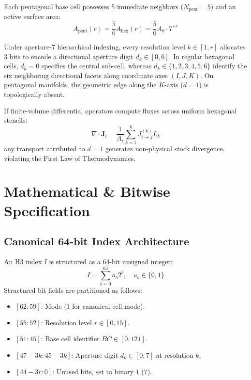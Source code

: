 \documentclass[10pt,twocolumn,a4paper]{article}
\theoremstyle{definition}
\begin{document}
Each pentagonal base cell possesses 5 immediate neighbors ($N_{\text{pent}} = 5$) and an active surface area:
\begin{equation}
A_{\text{pent}}(r) = \frac{5}{6} A_{\text{hex}}(r) = \frac{5}{6} A_0 \cdot 7^{-r}
\end{equation}

Under aperture-7 hierarchical indexing, every resolution level $k \in [1, r]$ allocates 3 bits to encode a directional aperture digit $d_k \in [0, 6]$. In regular hexagonal cells, $d_k = 0$ specifies the central sub-cell, whereas $d_k \in \{1, 2, 3, 4, 5, 6\}$ identify the six neighboring directional facets along coordinate axes $(I, J, K)$. On pentagonal manifolds, the geometric edge along the $K$-axis ($d=1$) is topologically absent.

If finite-volume differential operators compute fluxes across uniform hexagonal stencils:
\begin{equation}
\nabla \cdot \mathbf{J}_i = \frac{1}{A_i} \sum_{k=1}^6 J_{i \to j}^{(k)} L_k
\end{equation}
any transport attributed to $d=1$ generates non-physical stock divergence, violating the First Law of Thermodynamics.

\section{Mathematical \& Bitwise Specification}

\subsection{Canonical 64-bit Index Architecture}
An H3 index $I$ is structured as a 64-bit unsigned integer:
\begin{equation}
I = \sum_{b=0}^{63} a_b 2^b, \quad a_b \in \{0, 1\}
\end{equation}
Structured bit fields are partitioned as follows:
\begin{itemize}
    \item $[62:59]$: Mode ($1$ for canonical cell mode).
    \item $[55:52]$: Resolution level $r \in [0, 15]$.
    \item $[51:45]$: Base cell identifier $BC \in [0, 121]$.
    \item $[47 - 3k : 45 - 3k]$: Aperture digit $d_k \in [0, 7]$ at resolution $k$.
    \item $[44 - 3r : 0]$: Unused bits, set to binary $1$ ($7$).
\end{itemize}
\end{document}
